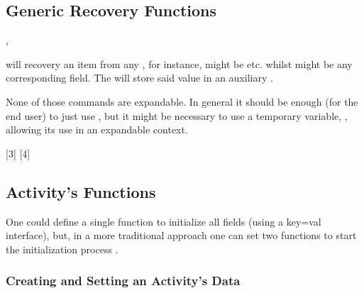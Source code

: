 \documentclass[10pt]{article}
\begin{document}
\subsection{Generic Recovery Functions}\label{generic:datafield}

\begin{codedescribe}{\DataField,\DataGet}
  \begin{codesyntax}
  \end{codesyntax}
\tsobj{\DataField} will recovery an item from any , for instance,  might be  etc. whilst  might be any corresponding field. The \tsobj{\DataGet} will store said value in an auxiliary .
\begin{tsremark}
  None of those commands are expandable. In general it should be enough (for the end user) to just use \tsobj{\DataField}, but it might be necessary to use a temporary variable, , allowing  its use in an expandable context.
\end{tsremark}
\end{codedescribe}


[3]
[4]

\subsection{Activity's Functions}

One could define a single function to initialize all fields (using a key=val interface), but, in a more traditional approach  one can set two functions to start the initialization process \tsobj{\NewActivity,\ActivitySet}. 


\subsubsection{Creating and Setting an Activity's Data}
\end{document}
